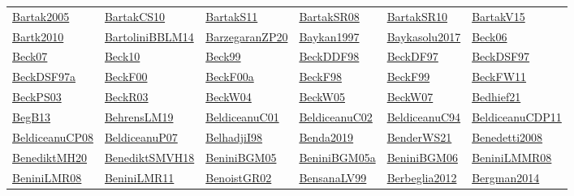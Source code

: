 \begin{longtable}{*{6}{l}}
\hyperref[detail:Bartak2005]{Bartak2005} & \hyperref[detail:BartakCS10]{BartakCS10} & \hyperref[detail:BartakS11]{BartakS11} & \hyperref[detail:BartakSR08]{BartakSR08} & \hyperref[detail:BartakSR10]{BartakSR10} & \hyperref[detail:BartakV15]{BartakV15}\\ 
\hyperref[detail:Bartk2010]{Bartk2010} & \hyperref[detail:BartoliniBBLM14]{BartoliniBBLM14} & \hyperref[detail:BarzegaranZP20]{BarzegaranZP20} & \hyperref[detail:Baykan1997]{Baykan1997} & \hyperref[detail:Baykasolu2017]{Baykasolu2017} & \hyperref[detail:Beck06]{Beck06}\\ 
\hyperref[detail:Beck07]{Beck07} & \hyperref[detail:Beck10]{Beck10} & \hyperref[detail:Beck99]{Beck99} & \hyperref[detail:BeckDDF98]{BeckDDF98} & \hyperref[detail:BeckDF97]{BeckDF97} & \hyperref[detail:BeckDSF97]{BeckDSF97}\\ 
\hyperref[detail:BeckDSF97a]{BeckDSF97a} & \hyperref[detail:BeckF00]{BeckF00} & \hyperref[detail:BeckF00a]{BeckF00a} & \hyperref[detail:BeckF98]{BeckF98} & \hyperref[detail:BeckF99]{BeckF99} & \hyperref[detail:BeckFW11]{BeckFW11}\\ 
\hyperref[detail:BeckPS03]{BeckPS03} & \hyperref[detail:BeckR03]{BeckR03} & \hyperref[detail:BeckW04]{BeckW04} & \hyperref[detail:BeckW05]{BeckW05} & \hyperref[detail:BeckW07]{BeckW07} & \hyperref[detail:Bedhief21]{Bedhief21}\\ 
\hyperref[detail:BegB13]{BegB13} & \hyperref[detail:BehrensLM19]{BehrensLM19} & \hyperref[detail:BeldiceanuC01]{BeldiceanuC01} & \hyperref[detail:BeldiceanuC02]{BeldiceanuC02} & \hyperref[detail:BeldiceanuC94]{BeldiceanuC94} & \hyperref[detail:BeldiceanuCDP11]{BeldiceanuCDP11}\\ 
\hyperref[detail:BeldiceanuCP08]{BeldiceanuCP08} & \hyperref[detail:BeldiceanuP07]{BeldiceanuP07} & \hyperref[detail:BelhadjiI98]{BelhadjiI98} & \hyperref[detail:Benda2019]{Benda2019} & \hyperref[detail:BenderWS21]{BenderWS21} & \hyperref[detail:Benedetti2008]{Benedetti2008}\\ 
\hyperref[detail:BenediktMH20]{BenediktMH20} & \hyperref[detail:BenediktSMVH18]{BenediktSMVH18} & \hyperref[detail:BeniniBGM05]{BeniniBGM05} & \hyperref[detail:BeniniBGM05a]{BeniniBGM05a} & \hyperref[detail:BeniniBGM06]{BeniniBGM06} & \hyperref[detail:BeniniLMMR08]{BeniniLMMR08}\\ 
\hyperref[detail:BeniniLMR08]{BeniniLMR08} & \hyperref[detail:BeniniLMR11]{BeniniLMR11} & \hyperref[detail:BenoistGR02]{BenoistGR02} & \hyperref[detail:BensanaLV99]{BensanaLV99} & \hyperref[detail:Berbeglia2012]{Berbeglia2012} & \hyperref[detail:Bergman2014]{Bergman2014}\\ 

\end{longtable}
